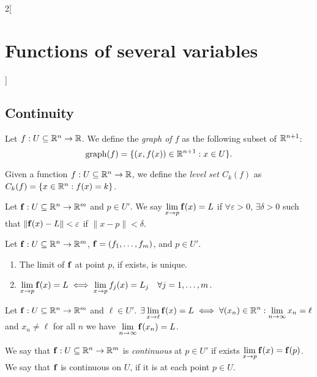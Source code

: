 \documentclass[../../../main.tex]{subfiles}
\begin{document}
\begin{multicols}{2}[\section{Functions of several variables}]
    \subsection{Continuity}
    \begin{definition}
        Let $f:U\subseteq\mathbb{R}^n\rightarrow\mathbb{R} $. We define the \textit{graph of $f$} as the following subset of $\mathbb{R}^{n+1}$: $$\text{graph}(f)=\{(x,f(x))\in\mathbb{R}^{n+1}:x\in U\}.$$
    \end{definition}
    \begin{definition}
        Given a function $f:U\subseteq\mathbb{R}^n\rightarrow\mathbb{R} $, we define the \textit{level set $C_k(f)$} as $C_k(f)=\{x\in\mathbb{R}^n:f(x)=k\}$.
    \end{definition}
    \begin{definition}
        Let $\vb{f}:U\subseteq\mathbb{R}^n\rightarrow\mathbb{R}^m$ and $p\in U'$. We say $\displaystyle\lim_{x\to p}\vb{f}(x)=L$ if $\forall\varepsilon>0$, $\exists\delta>0$ such that $\|\mathbf{\vb{f}}(x)-L\|<\varepsilon$ if $\|x-p\|<\delta$.
    \end{definition}
    \begin{prop}
        Let $\mathbf{\vb{f}}:U\subseteq\mathbb{R}^n\rightarrow\mathbb{R}^m$, $\mathbf{\vb{f}}=(f_1,\ldots,f_m)$, and $p\in U'$.
        \begin{enumerate}
            \item The limit of $\mathbf{\vb{f}}$ at point $p$, if exists, is unique.
            \item $\displaystyle\lim_{x\to p}\mathbf{\vb{f}}(x)=L\iff\lim_{x\to p}f_j(x)=L_j\quad\forall j=1,\ldots,m$.
        \end{enumerate}
    \end{prop}
    \begin{lemma}
        Let $\mathbf{\vb{f}}:U\subseteq\mathbb{R}^n\rightarrow\mathbb{R}^m$ and $\ell\in U'$. $\displaystyle\exists\lim_{x\to \ell}\mathbf{\vb{f}}(x)=L\iff\forall(x_n)\in\mathbb{R}^n:\lim_{n\to\infty}x_n=\ell$ and $x_n\ne \ell$ for all $n$ we have $\displaystyle\lim_{n\to \infty}\mathbf{\vb{f}}(x_n)=L$.
    \end{lemma}
    \begin{definition}
        We say that $\mathbf{\vb{f}}:U\subseteq\mathbb{R}^n\rightarrow\mathbb{R}^m$ is \textit{continuous} at $p\in U'$ if exists $\displaystyle\lim_{x\to p}\mathbf{\vb{f}}(x)=\mathbf{\vb{f}}(p)$. We say that $\mathbf{\vb{f}}$ is continuous on $U$, if it is at each point $p\in U$.
    \end{definition}

\end{multicols}
\end{document}
